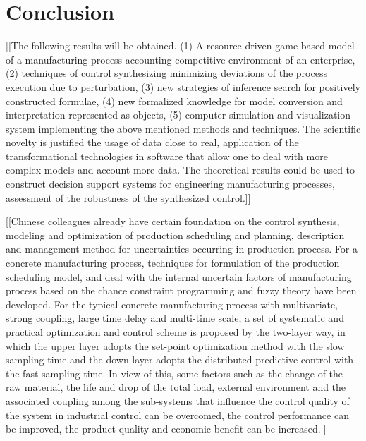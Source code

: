\documentclass[runningheads]{llncs}
\begin{document}
\section*{Conclusion}
\label{sec:conc}

[[The following results will be obtained. (1) A resource-driven game based model of a manufacturing process accounting competitive environment of an enterprise, (2) techniques of control synthesizing minimizing deviations of the process execution due to perturbation, (3) new strategies of inference search for positively constructed formulae, (4) new formalized knowledge for model conversion and interpretation represented as objects, (5) computer simulation and visualization system implementing the above mentioned methods and techniques. The scientific novelty is justified the usage of data close to real, application of the transformational technologies in software that allow one to deal with more complex models and account more data.
The theoretical results could be used to construct decision support systems for engineering manufacturing processes, assessment of the robustness of the synthesized control.]]

[[Chinese colleagues already have certain foundation on the control synthesis, modeling and optimization of production scheduling and planning, description and management method for uncertainties occurring in production process. For a concrete manufacturing process, techniques for formulation of the production scheduling model, and deal with the internal uncertain factors of manufacturing process based on the chance constraint programming and fuzzy theory \cite{b6} have been developed. For the typical concrete manufacturing process with multivariate, strong coupling, large time delay and multi-time scale, a set of systematic and practical optimization and control scheme is proposed by the two-layer way, in which the upper layer adopts the set-point optimization method with the slow sampling time and the down layer adopts the distributed predictive control with the fast sampling time. In view of this, some factors such as the change of the raw material, the life and drop of the total load, external environment and the associated coupling among the sub-systems that influence the control quality of the system in industrial control can be overcomed, the control performance can be improved, the product quality and economic benefit can be increased.]]
\end{document}

